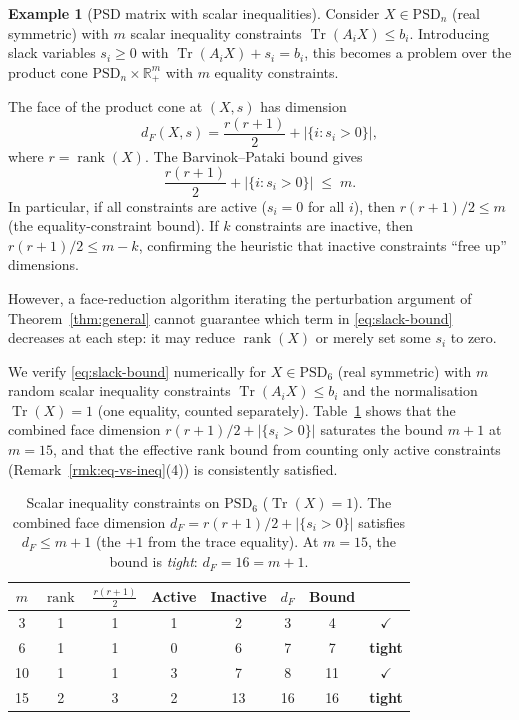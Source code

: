 \documentclass[11pt,a4paper]{article}
\theoremstyle{definition}
\newtheorem{example}[theorem]{Example}
\newcommand{\R}{\mathbb{R}}
\newcommand{\rank}{\operatorname{rank}}
\newcommand{\PSD}{\mathrm{PSD}}
\newcommand{\Tr}{\operatorname{Tr}}
\begin{document}
\begin{example}[PSD matrix with scalar inequalities]
\label{ex:scalar-ineq}
Consider $X \in \PSD_n$ (real symmetric) with $m$ scalar inequality
constraints $\Tr(A_i X) \leq b_i$.  Introducing slack variables
$s_i \geq 0$ with $\Tr(A_i X) + s_i = b_i$, this becomes a problem
over the product cone $\PSD_n \times \R_+^m$ with $m$ equality
constraints.

The face of the product cone at $(X, s)$ has dimension
\[
  d_F(X, s) = \frac{r(r+1)}{2} + |\{i : s_i > 0\}|,
\]
where $r = \rank(X)$.  The Barvinok--Pataki bound gives
\begin{equation}\label{eq:slack-bound}
  \frac{r(r+1)}{2} + |\{i : s_i > 0\}| \;\leq\; m.
\end{equation}
In particular, if all constraints are active ($s_i = 0$ for all
$i$), then $r(r+1)/2 \leq m$ (the equality-constraint bound).
If $k$ constraints are inactive, then
$r(r+1)/2 \leq m - k$, confirming the heuristic that inactive
constraints ``free up'' dimensions.

However, a face-reduction algorithm iterating the perturbation
argument of Theorem~\ref{thm:general} cannot guarantee which
term in \eqref{eq:slack-bound} decreases at each step: it may
reduce $\rank(X)$ or merely set some $s_i$ to zero.
\end{example}

We verify \eqref{eq:slack-bound} numerically for
$X \in \PSD_6$ (real symmetric) with $m$ random scalar inequality
constraints $\Tr(A_i X) \leq b_i$ and the normalisation
$\Tr(X) = 1$ (one equality, counted separately).  Table~\ref{tab:ineq-slack} shows that the combined face dimension
$r(r{+}1)/2 + |\{s_i > 0\}|$ saturates the bound $m + 1$ at
$m = 15$, and that the effective rank bound from counting only
active constraints (Remark~\ref{rmk:eq-vs-ineq}(4)) is
consistently satisfied.

\begin{table}[htbp]
\centering
\caption{Scalar inequality constraints on $\PSD_6$
($\Tr(X) = 1$).  The combined face dimension
$d_F = r(r{+}1)/2 + |\{s_i > 0\}|$ satisfies $d_F \leq m + 1$
(the $+1$ from the trace equality).  At $m = 15$,
the bound is \emph{tight}: $d_F = 16 = m + 1$.}
\label{tab:ineq-slack}
\begin{tabular}{cccccccc}
\toprule
$m$ & $\rank$ & $\frac{r(r{+}1)}{2}$ & Active & Inactive
  & $d_F$ & Bound & \\
\midrule
 3 & 1 & 1 & 1 & 2 &  3 &  4 & $\checkmark$ \\
 6 & 1 & 1 & 0 & 6 &  7 &  7 & \textbf{tight} \\
10 & 1 & 1 & 3 & 7 &  8 & 11 & $\checkmark$ \\
15 & 2 & 3 & 2 & 13 & 16 & 16 & \textbf{tight} \\
\bottomrule
\end{tabular}
\end{table}
\end{document}
